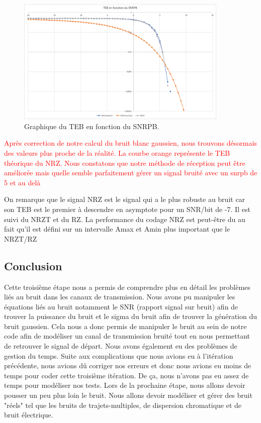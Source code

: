 \begin{figure}[H]
\centering
\includegraphics[width=0.9\textwidth]{img/tebvssnrpb.png}
\caption{\label{fig:TEBenFonctionDesSNR}Graphique du TEB en fonction du SNRPB.}
\end{figure}

\textcolor{red}{Après correction de notre calcul du bruit blanc gaussien, nous trouvons désormais des valeurs plus proche de la réalité. La courbe orange représente le TEB théorique du NRZ. Nous constatons que notre méthode de réception peut être améliorée mais quelle semble parfaitement gérer un signal bruité avec un snrpb de 5 et au delà}

On remarque que le signal NRZ est le signal qui a le plus robuste au bruit car son TEB est le premier à descendre  en asymptote pour un SNR/bit de -7. Il est suivi du NRZT et du RZ. La performance du codage NRZ est peut-être du au fait qu'il est défini sur un intervalle Amax et Amin plus important que le NRZT/RZ

\subsection{Conclusion}

Cette troisième étape nous a permis de comprendre plus en détail les problèmes liés au bruit dans les canaux de transmission. Nous avons pu manipuler les équations liés au bruit notamment le SNR (rapport signal sur bruit) afin de trouver la puissance du bruit et le sigma du bruit afin de trouver la génération du bruit gaussien. Cela nous a donc permis de manipuler le bruit au sein de notre code afin de modéliser un canal de transmission bruité tout en nous permettant de retrouver le signal de départ.
Nous avons également eu des problèmes de gestion du temps. Suite aux complications que nous avions eu à l'itération précédente, nous avions dû corriger nos erreurs et donc nous avions eu moins de temps pour coder cette troisième itération. De ça, nous n'avons pas eu assez de temps pour modéliser nos tests.
Lors de la prochaine étape, nous allons devoir pousser un peu plus loin le bruit. Nous allons devoir modéliser et gérer des bruit "réels" tel que les bruits de trajets-multiples, de dispersion chromatique et de bruit électrique.